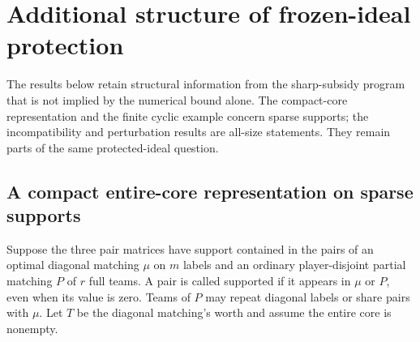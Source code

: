 \section{Additional structure of frozen-ideal protection}\label{anc:section}
The results below retain structural information from the sharp-subsidy
program that is not implied by the numerical bound alone. The compact-core
representation and the finite cyclic example concern sparse supports;
the incompatibility and perturbation results are all-size statements.
They remain parts of the same protected-ideal question.

\subsection{A compact entire-core representation on sparse supports}
Suppose the three pair matrices have support contained in the pairs of
an optimal diagonal matching $\mu$ on $m$ labels and an ordinary
player-disjoint partial matching $P$ of $r$ full teams. A pair is called
supported if it appears in $\mu$ or $P$, even when its value is zero.
Teams of $P$ may repeat diagonal labels or share pairs with $\mu$.
Let $T$ be the diagonal matching's worth and assume the entire core is
nonempty.

